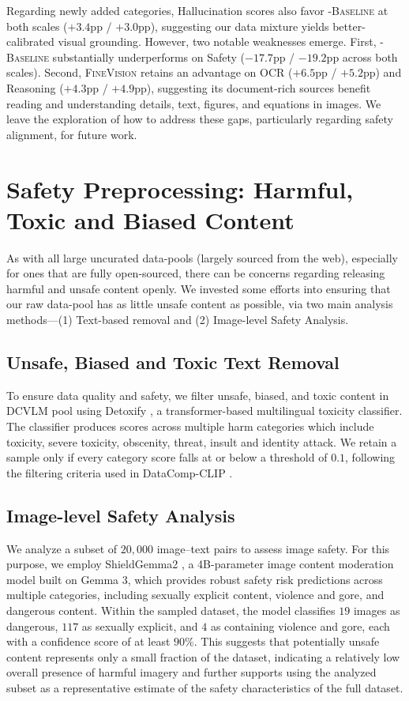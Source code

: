 Regarding newly added categories, Hallucination scores also favor \textsc{\dcvlm-Baseline} at both scales ($+3.4$pp / $+3.0$pp), suggesting our data mixture yields better-calibrated visual grounding.
However, two notable weaknesses emerge. 
First, \textsc{\dcvlm-Baseline} substantially underperforms on Safety ($-17.7$pp / $-19.2$pp across both scales). Second, \textsc{FineVision} retains an advantage on OCR ($+6.5$pp / $+5.2$pp) and Reasoning ($+4.3$pp / $+4.9$pp), suggesting its document-rich sources benefit reading and understanding details, text, figures, and equations in images. 
We leave the exploration of how to address these gaps, particularly regarding safety alignment, for future work.



\clearpage

\section{Safety Preprocessing: Harmful, Toxic and Biased Content}\label{app:safety}
As with all large uncurated data-pools (largely sourced from the web), especially for ones that are fully open-sourced, there can be concerns regarding releasing harmful and unsafe content openly. We invested some efforts into ensuring that our raw data-pool has as little unsafe content as possible, via two main analysis methods---(1) Text-based removal and (2) Image-level Safety Analysis.
\subsection{Unsafe, Biased and Toxic Text Removal}
To ensure data quality and safety, we filter unsafe, biased, and toxic content in DCVLM pool using Detoxify \cite{Detoxify}, a transformer-based multilingual toxicity classifier. The classifier produces scores across multiple harm categories which include toxicity, severe toxicity, obscenity, threat, insult and identity attack. We retain a sample only if every category score falls at or below a threshold of $0.1$, following the filtering criteria used in DataComp-CLIP \cite{gadre2023datacomp}. 

\subsection{Image-level Safety Analysis}
We analyze a subset of $20,000$ image–text pairs to assess image safety. For this purpose, we employ ShieldGemma2 \cite{zeng2025shieldgemma2}, a 4B-parameter image content moderation model built on Gemma 3, which provides robust safety risk predictions across multiple categories, including sexually explicit content, violence and gore, and dangerous content. Within the sampled dataset, the model classifies $19$ images as dangerous, $117$ as sexually explicit, and $4$ as containing violence and gore, each with a confidence score of at least $90\%$. This suggests that potentially unsafe content represents only a small fraction of the dataset, indicating a relatively low overall presence of harmful imagery and further supports using the analyzed subset as a representative estimate of the safety characteristics of the full dataset.
\clearpage

